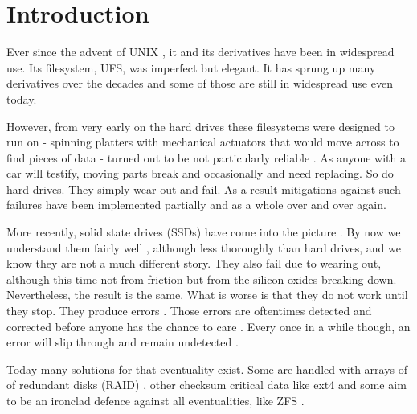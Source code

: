\chapter{Introduction}

    Ever since the advent of UNIX \cite{UFS}, it and its derivatives have been
    in widespread use. Its filesystem, UFS, was imperfect \cite{FFS} but
    elegant. It has sprung up many derivatives \cite{FFS, LFS, WAFL,
    ext4_origin, ZFS, XFS_scalability} over the decades and some of those are
    still in widespread use even today.

    However, from very early on the hard drives these filesystems were designed
    to run on - spinning platters with mechanical actuators that would move
    across to find pieces of data - turned out to be not particularly reliable
    \cite{Backblaze_stats, hard_drive_failures, RAID,
    data_corruption_storage_stack}. As anyone with a car will testify, moving
    parts break and occasionally and need replacing. So do hard drives. They
    simply wear out and fail. As a result mitigations against such failures
    have been implemented partially \cite{FFS, ext4_docs} and as a whole
    \cite{ZFS} over and over again.


    More recently, solid state drives (SSDs) have come into the picture
    \cite{SSD_sales}. By now we understand them fairly well
    \cite{flash_error_manual}, although less thoroughly than hard drives, and
    we know they are not a much different story. They also fail due to wearing
    out, although this time not from friction but from the silicon oxides
    breaking down. Nevertheless, the result is the same. What is worse is that
    they do not work until they stop. They produce errors \cite{bit_error_mlc,
    bit_error_qlc, flash_large_scale}. Those errors are oftentimes detected and
    corrected before anyone has the chance to care \cite{flash_error_manual}.
    Every once in a while though, an error will slip through and remain
    undetected \cite{flash_reliability}.

    Today many solutions for that eventuality exist. Some are handled with
    arrays of of redundant disks (RAID) \cite{RAID}, other checksum critical
    data like ext4 \cite{ext4_docs} and some aim to be an ironclad defence
    against all eventualities, like ZFS \cite{ZFS}.

